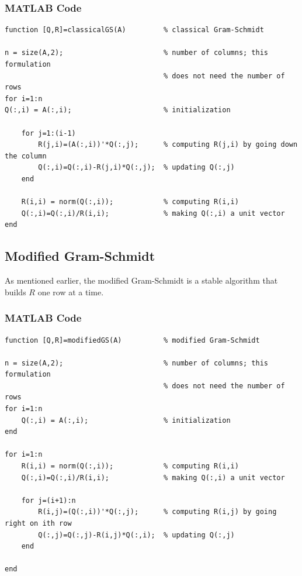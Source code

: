 \documentclass[letterpaper]{article}
\newcommand{\0}{\mathbf{0}}
\begin{document}
\subsubsection{MATLAB Code}
\begin{mdframed}
    \begin{verbatim}
function [Q,R]=classicalGS(A)         % classical Gram-Schmidt

n = size(A,2);                        % number of columns; this formulation
                                      % does not need the number of rows
for i=1:n                             
Q(:,i) = A(:,i);                      % initialization
   
    for j=1:(i-1)
        R(j,i)=(A(:,i))'*Q(:,j);      % computing R(j,i) by going down the column
        Q(:,i)=Q(:,i)-R(j,i)*Q(:,j);  % updating Q(:,j)
    end
   
    R(i,i) = norm(Q(:,i));            % computing R(i,i) 
    Q(:,i)=Q(:,i)/R(i,i);             % making Q(:,i) a unit vector
end
    \end{verbatim}
\end{mdframed}


\subsection{Modified Gram-Schmidt}
As mentioned earlier, the modified Gram-Schmidt is a stable algorithm that builds $R$ one row at a time. 

\subsubsection{MATLAB Code}
\begin{mdframed}
    \begin{verbatim}
function [Q,R]=modifiedGS(A)          % modified Gram-Schmidt

n = size(A,2);                        % number of columns; this formulation
                                      % does not need the number of rows
for i=1:n                             
    Q(:,i) = A(:,i);                  % initialization
end

for i=1:n
    R(i,i) = norm(Q(:,i));            % computing R(i,i) 
    Q(:,i)=Q(:,i)/R(i,i);             % making Q(:,i) a unit vector

    for j=(i+1):n
        R(i,j)=(Q(:,i))'*Q(:,j);      % computing R(i,j) by going right on ith row
        Q(:,j)=Q(:,j)-R(i,j)*Q(:,i);  % updating Q(:,j)
    end

end
    \end{verbatim}
\end{mdframed}
\end{document}
